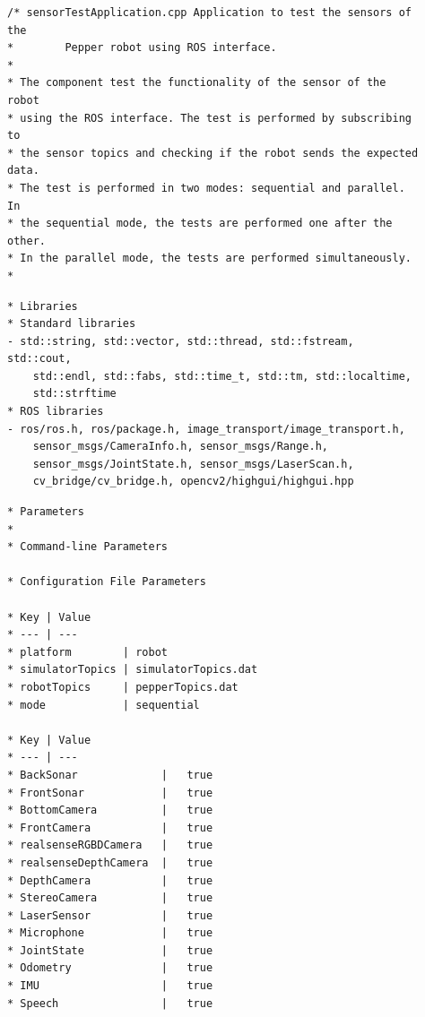 \documentclass{CSSRforAfrica}
\newcommand{\checkboxChecked}{\fbox{\ding{51}}} %
\begin{document}
\begin{description}

\item[\checkboxChecked] 
 {\small 
\begin{verbatim}
/* sensorTestApplication.cpp Application to test the sensors of the
*        Pepper robot using ROS interface.
*
* The component test the functionality of the sensor of the robot
* using the ROS interface. The test is performed by subscribing to
* the sensor topics and checking if the robot sends the expected data.
* The test is performed in two modes: sequential and parallel. In
* the sequential mode, the tests are performed one after the other.
* In the parallel mode, the tests are performed simultaneously.
*
\end{verbatim}}

\item[\checkboxChecked] 
 {\small 
\begin{verbatim}
* Libraries
* Standard libraries
- std::string, std::vector, std::thread, std::fstream, std::cout,
    std::endl, std::fabs, std::time_t, std::tm, std::localtime,
    std::strftime
* ROS libraries
- ros/ros.h, ros/package.h, image_transport/image_transport.h,
    sensor_msgs/CameraInfo.h, sensor_msgs/Range.h,
    sensor_msgs/JointState.h, sensor_msgs/LaserScan.h,
    cv_bridge/cv_bridge.h, opencv2/highgui/highgui.hpp
\end{verbatim}}

\item[\checkboxChecked] 
 {\small 
\begin{verbatim}
* Parameters
*
* Command-line Parameters

* Configuration File Parameters

* Key | Value 
* --- | ---
* platform        | robot
* simulatorTopics | simulatorTopics.dat
* robotTopics     | pepperTopics.dat
* mode            | sequential

* Key | Value
* --- | ---
* BackSonar             |   true
* FrontSonar            |   true    
* BottomCamera          |   true
* FrontCamera           |   true
* realsenseRGBDCamera   |   true
* realsenseDepthCamera  |   true
* DepthCamera           |   true
* StereoCamera          |   true
* LaserSensor           |   true
* Microphone            |   true
* JointState            |   true
* Odometry              |   true
* IMU                   |   true
* Speech                |   true
\end{verbatim}}


\end{description}
\end{document}

